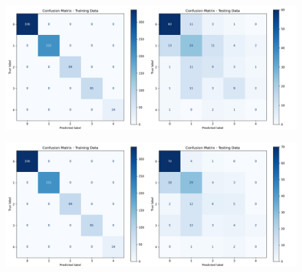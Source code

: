 \documentclass[pdflatex,sn-nature,Numbered]{sn-jnl}%
\theoremstyle{thmstyleone}%
\theoremstyle{thmstyletwo}%
\theoremstyle{thmstylethree}%
\begin{document}
\begin{figure}[htbp]
\begin{minipage}{0.45\textwidth}
    \centering
    \includegraphics[width=\linewidth]{files/Decision1.png}
    \label{fig:image5}
\end{minipage}%
\hfill
\begin{minipage}{0.45\textwidth}
    \centering
    \includegraphics[width=\linewidth]{files/random1.png}
    \label{fig:image6}
\end{minipage}

\vspace{1em}


\end{figure}
\end{document}

